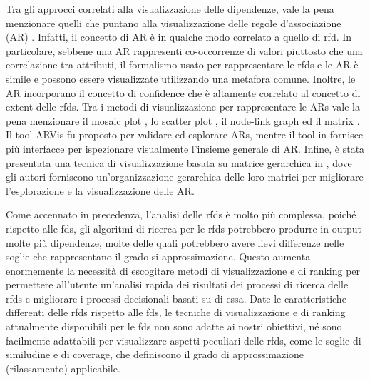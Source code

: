 Tra gli approcci correlati alla visualizzazione delle dipendenze, vale la pena menzionare quelli che puntano alla visualizzazione delle regole d'associazione (AR) \cite{chenvisualanalysis,visualassrules,wifisviz,assocexplorer}. Infatti, il concetto di AR \`{e} in qualche modo correlato a quello di \acrshort{rfd}. In particolare, sebbene una AR rappresenti co-occorrenze di valori piuttosto che una correlazione tra attributi, il formalismo usato per rappresentare le \acrshort{rfds} e le AR \`{e} simile e possono essere visualizzate utilizzando una metafora comune. Inoltre, le AR incorporano il concetto di confidence che \`{e} altamente correlato al concetto di extent delle \acrshort{rfds}. Tra i metodi di visualizzazione per rappresentare le ARs vale la pena menzionare il mosaic plot \cite{visualassrules}, lo scatter plot \cite{assocexplorer}, il node-link graph \cite{wifisviz} ed il matrix \cite{vaet}. Il tool ARVis fu proposto per validare ed esplorare ARs, mentre il tool in \cite{visualassrulesusingmatrix} fornisce pi\`{u} interfacce per ispezionare visualmente l'insieme generale di AR. Infine, \`{e} stata presentata una tecnica di visualizzazione basata su matrice gerarchica in \cite{chenvisualanalysis}, dove gli autori forniscono un'organizzazione gerarchica delle loro matrici per migliorare l'esplorazione e la visualizzazione delle AR.\par
Come accennato in precedenza, l'analisi delle \acrshort{rfds} \`{e} molto pi\`{u} complessa, poich\'{e} rispetto alle \acrshort{fds}, gli algoritmi di ricerca per le \acrshort{rfds} potrebbero produrre in output molte pi\`{u} dipendenze, molte delle quali potrebbero avere lievi differenze nelle soglie che rappresentano il grado si approssimazione. Questo aumenta enormemente la necessit\`{a} di escogitare metodi di visualizzazione e di ranking per permettere all'utente un'analisi rapida dei risultati dei processi di ricerca delle \acrshort{rfds} e migliorare i processi decisionali basati su di essa. Date le caratteristiche differenti delle \acrshort{rfds} rispetto alle \acrshort{fds}, le tecniche di visualizzazione e di ranking attualmente disponibili per le \acrshort{fds} non sono adatte ai nostri obiettivi, n\'{e} sono facilmente adattabili per visualizzare aspetti peculiari delle \acrshort{rfds}, come le soglie di similudine e di coverage, che definiscono il grado di approssimazione (rilassamento) applicabile.

\newpage